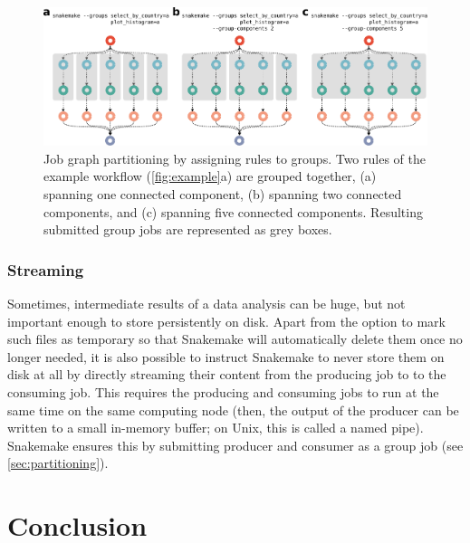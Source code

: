 \documentclass[10pt,a4paper,twocolumn]{article}
\begin{document}
\begin{figure}
    \centering
	\includegraphics[width=15cm]{group-jobs.pdf}
	\caption{Job graph partitioning by assigning rules to groups.
		Two rules of the example workflow (\autoref{fig:example}a) are grouped together, (a) spanning one connected component, (b) spanning two connected components, and (c) spanning five connected components.
		Resulting submitted group jobs are represented as grey boxes.
	}\label{fig:grouping}
\end{figure}

\subsubsection{Streaming}\label{sec:streaming}

Sometimes, intermediate results of a data analysis can be huge, but not important enough to store persistently on disk.
Apart from the option to mark such files as temporary so that Snakemake will automatically delete them once no longer needed, it is also possible to instruct Snakemake to never store them on disk at all by directly streaming their content from the producing job to to the consuming job.
This requires the producing and consuming jobs to run at the same time on the same computing node (then, the output of the producer can be written to a small in-memory buffer; on Unix, this is called a named pipe).
Snakemake ensures this by submitting producer and consumer as a group job (see \autoref{sec:partitioning}).

\section{Conclusion}
\end{document}
